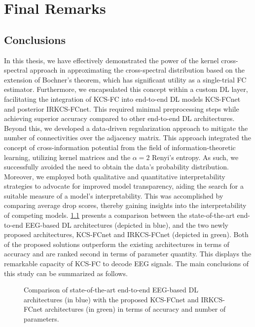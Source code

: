 \chapter{Final Remarks}


\section{Conclusions}

In this thesis, we have effectively demonstrated the power of the kernel cross-spectral approach in approximating the cross-spectral distribution based on the extension of Bochner's theorem, which has significant utility as a single-trial FC estimator. Furthermore, we encapsulated this concept within a custom DL layer, facilitating the integration of KCS-FC into end-to-end DL models KCS-FCnet and posterior IRKCS-FCnet. This required minimal preprocessing steps while achieving superior accuracy compared to other end-to-end DL architectures. Beyond this, we developed a data-driven regularization approach to mitigate the number of connectivities over the adjacency matrix. This approach integrated the concept of cross-information potential from the field of information-theoretic learning, utilizing kernel matrices and the $\alpha = 2$ Renyi's entropy. As such, we successfully avoided the need to obtain the data's probability distribution. Moreover, we employed both qualitative and quantitative interpretability strategies to advocate for improved model transparency, aiding the search for a suitable measure of a model's interpretability. This was accomplished by comparing average drop scores, thereby gaining insights into the interpretability of competing models. \cref{fig:final_comparison} presents a comparison between the state-of-the-art end-to-end EEG-based DL architectures (depicted in blue), and the two newly proposed architectures, KCS-FCnet and IRKCS-FCnet (depicted in green). Both of the proposed solutions outperform the existing architectures in terms of accuracy and are ranked second in terms of parameter quantity. This displays the remarkable capacity of KCS-FC to decode EEG signals. The main conclusions of this study can be summarized as follows. 

\begin{figure}[h!]
    \centering
    \resizebox{0.9\linewidth}{!}{}
    \caption{Comparison of state-of-the-art end-to-end EEG-based DL architectures (in blue) with the proposed KCS-FCnet and IRKCS-FCnet architectures (in green) in terms of accuracy and number of parameters. \label{fig:final_comparison}}
\end{figure}

